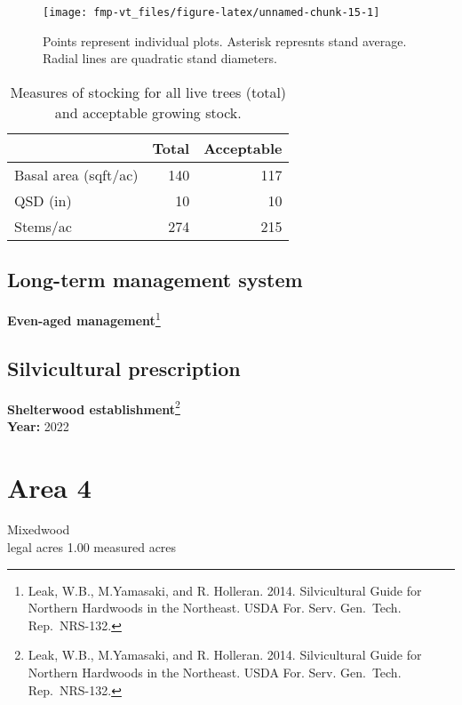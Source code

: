 \documentclass[]{tufte-handout}
\begin{document}
\begin{figure}
\texttt{[image: fmp-vt\_files/figure-latex/unnamed-chunk-15-1]} \caption[Points represent individual plots]{Points represent individual plots. Asterisk represnts stand average. Radial lines are quadratic stand diameters.}\label{fig:unnamed-chunk-15}
\end{figure}

\begin{table}

\caption{\label{tab:unnamed-chunk-16}Measures of stocking for all live trees (total) and acceptable growing stock.}
\centering
\begin{tabular}[t]{lrr}
\toprule
  & Total & Acceptable\\
\midrule
Basal area (sqft/ac) & 140 & 117\\
QSD (in) & 10 & 10\\
Stems/ac & 274 & 215\\
\bottomrule
\end{tabular}
\end{table}

\subsection{Long-term management
system}\label{long-term-management-system-2}

\textbf{Even-aged management}\footnote{Leak, W.B., M.Yamasaki, and R.
  Holleran. 2014. Silvicultural Guide for Northern Hardwoods in the
  Northeast. USDA For. Serv. Gen.~Tech. Rep.~NRS-132.}

\subsection{Silvicultural
prescription}\label{silvicultural-prescription-2}

\textbf{Shelterwood establishment}\footnote{Leak, W.B., M.Yamasaki, and
  R. Holleran. 2014. Silvicultural Guide for Northern Hardwoods in the
  Northeast. USDA For. Serv. Gen.~Tech. Rep.~NRS-132.}\\
\textbf{Year:} 2022

\newpage

\section{Area 4}\label{area-4}

Mixedwood\\
 legal acres \textbar{} 1.00 measured acres
\end{document}
